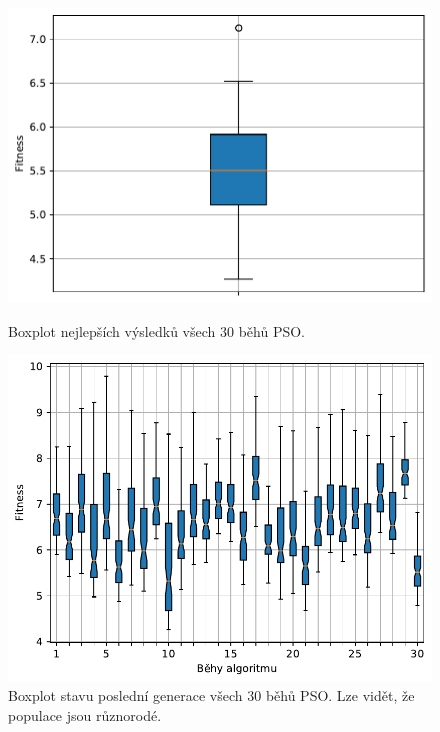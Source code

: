 \begin{figure}[H]
\begin{minipage}[t]{0.475\linewidth}
\includegraphics[width=\linewidth]{obrazky-figures/statistics/Benchmarks/Ackley/PSO/bestsBoxplot_WithOutliers.pdf}
\caption{Boxplot nejlepších výsledků všech $30$ běhů PSO.}
\label{fg:bench:ackley:pso:best}
\end{minipage}
\hfill
\begin{minipage}[t]{0.475\linewidth}
\includegraphics[width=\linewidth]{obrazky-figures/statistics/Benchmarks/Ackley/PSO/lastGenBoxplots.pdf}
\caption{Boxplot stavu poslední generace všech $30$ běhů PSO. Lze vidět, že populace jsou různorodé.}
\label{fg:bench:ackley:pso:lastGen}
\end{minipage}
\end{figure}
